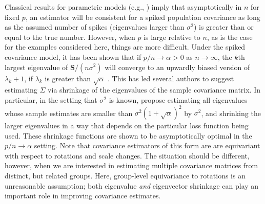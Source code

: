 \documentclass[12pt]{article}
\newcommand{\bl}[1]{{\mathbf #1}}
\begin{document}
Classical results for parametric models (e.g., \citet{Schwartz1965})
imply that asymptotically in $n$ for fixed $p$, an estimator will be
consistent for a spiked population covariance as long as the assumed
number of spikes (eigenvalues larger than $\sigma^2$) is greater than
or equal to the true number.  However, when $p$ is large relative to
$n$, as is the case for the examples considered here, things are more
difficult.  Under the spiked covariance model, it has been shown that
if $p/n \rightarrow \alpha >0$ as $n\rightarrow \infty$, the $k$th
largest eigenvalue of $\bl S/(n\sigma^2)$ will converge to an upwardly
biased version of $\lambda_{k}+1$, if $\lambda_k$ is greater than
$\sqrt{\alpha}$ \citep{Baik2006, Paul2007} .  This has led several
authors to suggest estimating $\Sigma$ via shrinkage of the
eigenvalues of the sample covariance matrix. In particular, in the
setting that $\sigma^2$ is known, \citet{Donoho2013} propose
estimating all eigenvalues whose sample estimates are smaller than
$\sigma^2(1+\sqrt{\alpha})^2$ by $\sigma^2$, and shrinking the larger
eigenvalues in a way that depends on the particular loss function
being used.  These shrinkage functions are shown to be asymptotically
optimal in the $p/n\rightarrow \alpha$ setting.  Note that covariance
estimators of this form are are equivariant with respect to rotations
and scale changes.  The situation should be different, however, when
we are interested in estimating multiple covariance matrices from
distinct, but related groups.  Here, group-level equivariance to
rotations is an unreasonable assumption; both eigenvalue \emph{and}
eigenvector shrinkage can play an important role in improving
covariance estimates.



\end{document}
